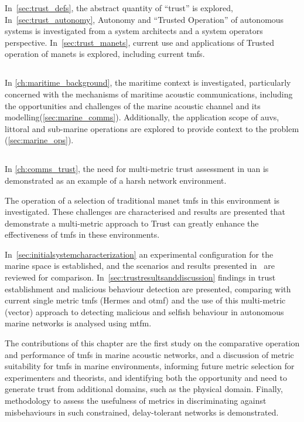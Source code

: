 In~\autoref{sec:trust_defs}, the abstract quantity of ``trust'' is explored,
In~\autoref{sec:trust_autonomy}, Autonomy and ``Trusted Operation'' of autonomous systems is investigated from a system architects and a system operators perspective.
In~\autoref{sec:trust_manets}, current use and applications of Trusted operation of \glspl{manet} is explored, including current \glspl{tmf}.

\subsection{}
In \autoref{ch:maritime_background}, the maritime context is investigated, particularly concerned with the mechanisms of maritime acoustic communications, including the opportunities and challenges of the marine acoustic channel and its modelling(\autoref{sec:marine_comms}).
Additionally, the application scope of \glspl{auv}, littoral and sub-marine operations are explored to provide context to the problem (\autoref{sec:marine_ops}).

\subsection{}
In \autoref{ch:comms_trust}, the need for multi-metric trust assessment in \gls{uan} is demonstrated as an example of a harsh network environment.

The operation of a selection of traditional \gls{manet} \glspl{tmf} in this environment is investigated.
These challenges are characterised and results are presented that demonstrate a multi-metric approach to Trust can greatly enhance the effectiveness of \glspl{tmf} in these environments.

In~\autoref{sec:initialsystemcharacterization} an experimental configuration for the marine space is established, and the scenarios and results presented in~\citet{Guo11} are reviewed for comparison.
In~\autoref{sec:trustresultsanddiscussion} findings in trust establishment and malicious behaviour detection are presented, comparing with current single metric \glspl{tmf} (Hermes and \gls{otmf}) and the use of this multi-metric (vector) approach to detecting malicious and selfish behaviour in autonomous marine networks is analysed using \gls{mtfm}.

The contributions of this chapter are the first study on the comparative operation and performance of \glspl{tmf} in marine acoustic networks, and a discussion of metric suitability for \glspl{tmf} in marine environments, informing future metric selection for experimenters and theorists, and identifying both the opportunity and need to generate trust from additional domains, such as the physical domain.
Finally, methodology to assess the usefulness of metrics in discriminating against misbehaviours in such constrained, delay-tolerant networks is demonstrated.

